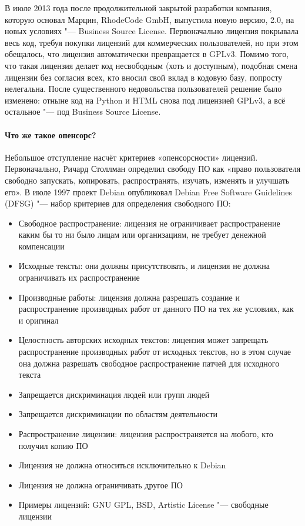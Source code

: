 \documentclass[10pt, a5paper]{article}
\begin{document}
В июле 2013 года после продолжительной закрытой разработки компания, которую основал Марцин, RhodeCode GmbH, выпустила новую версию, 2.0, на новых условиях "--- Business Source License. Первоначально лицензия покрывала весь код, требуя покупки лицензий для коммерческих пользователей, но при этом обещалось, что лицензия автоматически превращается в GPLv3. Помимо того, что такая лицензия делает код несвободным (хоть и доступным), подобная смена лицензии без согласия всех, кто вносил свой вклад в кодовую базу, попросту нелегальна. После существенного недовольства пользователей решение было изменено: отныне код на Python и HTML снова под лицензией GPLv3, а всё остальное "--- под Business Source License.

\paragraph{Что же такое опенсорс?}

Небольшое отступление насчёт критериев «опенсорсности» лицензий. Первоначально, Ричард Столлман определил свободу ПО как «право пользователя свободно запускать, копировать, распространять, изучать, изменять и улучшать его». В июле 1997 проект Debian опубликовал Debian Free Software Guidelines (DFSG) "--- набор критериев для определения свободного ПО:

\begin{itemize}
  \item Свободное распространение: лицензия не ограничивает распространение каким бы то ни было лицам или организациям, не требует денежной компенсации
  \item Исходные тексты: они должны присутствовать, и лицензия не должна ограничивать их распространение
  \item Производные работы: лицензия должна разрешать создание и распространение производных работ от данного ПО на тех же условиях, как и оригинал
  \item Целостность авторских исходных текстов: лицензия может запрещать распространение производных работ от исходных текстов, но в этом случае она должна разрешать свободное распространение патчей для исходного текста
  \item Запрещается дискриминация людей или групп людей
  \item Запрещается дискриминации по областям деятельности
  \item Распространение лицензии: лицензия распространяется на любого, кто получил копию ПО
  \item Лицензия не должна относиться исключительно к Debian
  \item Лицензия не должна ограничивать другое ПО
  \item Примеры лицензий: GNU GPL, BSD, Artistic License "--- свободные лицензии
\end{itemize}
\end{document}

